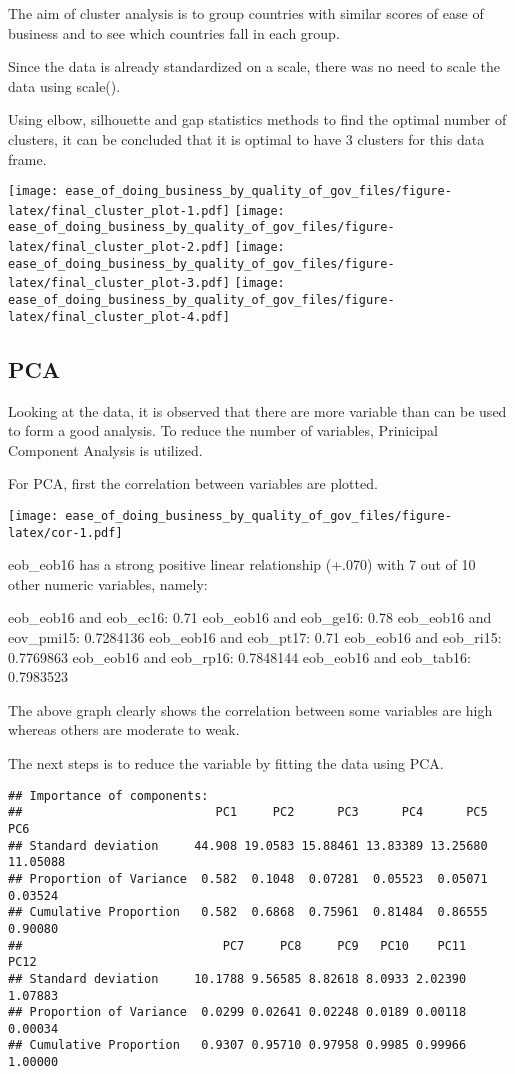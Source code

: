 \documentclass[
]{article}
\begin{document}
The aim of cluster analysis is to group countries with similar scores of
ease of business and to see which countries fall in each group.

Since the data is already standardized on a scale, there was no need to
scale the data using scale().

Using elbow, silhouette and gap statistics methods to find the optimal
number of clusters, it can be concluded that it is optimal to have 3
clusters for this data frame.

\texttt{[image: ease\_of\_doing\_business\_by\_quality\_of\_gov\_files/figure-latex/final\_cluster\_plot-1.pdf]}
\texttt{[image: ease\_of\_doing\_business\_by\_quality\_of\_gov\_files/figure-latex/final\_cluster\_plot-2.pdf]}
\texttt{[image: ease\_of\_doing\_business\_by\_quality\_of\_gov\_files/figure-latex/final\_cluster\_plot-3.pdf]}
\texttt{[image: ease\_of\_doing\_business\_by\_quality\_of\_gov\_files/figure-latex/final\_cluster\_plot-4.pdf]}

\hypertarget{pca}{%
\subsection{PCA}\label{pca}}

Looking at the data, it is observed that there are more variable than
can be used to form a good analysis. To reduce the number of variables,
Prinicipal Component Analysis is utilized.

For PCA, first the correlation between variables are plotted.

\texttt{[image: ease\_of\_doing\_business\_by\_quality\_of\_gov\_files/figure-latex/cor-1.pdf]}

eob\_eob16 has a strong positive linear relationship (+.070) with 7 out
of 10 other numeric variables, namely:

eob\_eob16 and eob\_ec16: 0.71 eob\_eob16 and eob\_ge16: 0.78 eob\_eob16
and eov\_pmi15: 0.7284136 eob\_eob16 and eob\_pt17: 0.71 eob\_eob16 and
eob\_ri15: 0.7769863 eob\_eob16 and eob\_rp16: 0.7848144 eob\_eob16 and
eob\_tab16: 0.7983523

The above graph clearly shows the correlation between some variables are
high whereas others are moderate to weak.

The next steps is to reduce the variable by fitting the data using PCA.

\begin{verbatim}
## Importance of components:
##                           PC1     PC2      PC3      PC4      PC5      PC6
## Standard deviation     44.908 19.0583 15.88461 13.83389 13.25680 11.05088
## Proportion of Variance  0.582  0.1048  0.07281  0.05523  0.05071  0.03524
## Cumulative Proportion   0.582  0.6868  0.75961  0.81484  0.86555  0.90080
##                            PC7     PC8     PC9   PC10    PC11    PC12
## Standard deviation     10.1788 9.56585 8.82618 8.0933 2.02390 1.07883
## Proportion of Variance  0.0299 0.02641 0.02248 0.0189 0.00118 0.00034
## Cumulative Proportion   0.9307 0.95710 0.97958 0.9985 0.99966 1.00000
\end{verbatim}
\end{document}
